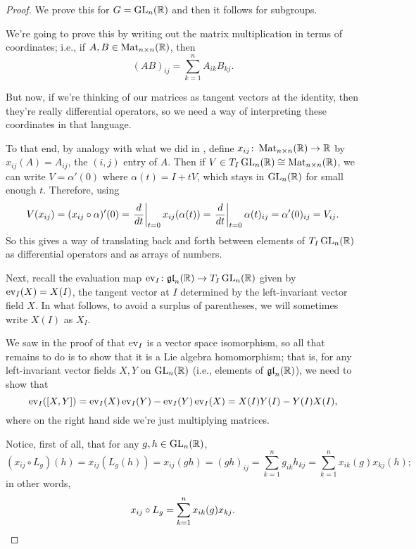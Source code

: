 \begin{proof}
	We prove this for $G = \operatorname{GL}_n(\mathbb{R})$ and then it follows for subgroups.
	
	We're going to prove this by writing out the matrix multiplication in terms of coordinates; i.e., if $A,B \in \operatorname{Mat}_{n \times n}(\mathbb{R})$, then
	\[
		(AB)_{ij} = \sum_{k=1}^n A_{ik}B_{kj}.
	\]
	
	But now, if we're thinking of our matrices as tangent vectors at the identity, then they're really differential operators, so we need a way of interpreting these coordinates in that language.
	
	To that end, by analogy with what we did in , define $x_{ij} \colon\thinspace\! \operatorname{Mat}_{n \times n}(\mathbb{R}) \to \mathbb{R}$ by $x_{ij}(A) = A_{ij}$, the $(i,j)$ entry of $A$. Then if $V \in T_I \operatorname{GL}_n(\mathbb{R}) \cong \operatorname{Mat}_{n \times n}(\mathbb{R})$, we can write $V = \alpha'(0)$ where $\alpha(t) = I + tV$, which stays in $\operatorname{GL}_n(\mathbb{R})$ for small enough $t$. Therefore, using 
	\begin{equation}\label{eq:V(x_{ij})}
		V(x_{ij}) = (x_{ij} \circ \alpha)'(0) = \left. \frac{d}{dt}\right|_{t=0} x_{ij}(\alpha(t)) = \left. \frac{d}{dt}\right|_{t=0} \alpha(t)_{ij} = \alpha'(0)_{ij} = V_{ij}.
	\end{equation}
	So this gives a way of translating back and forth between elements of $T_I\operatorname{GL}_n(\mathbb{R})$ as differential operators and as arrays of numbers.
	
	Next, recall the evaluation map $\operatorname{ev}_I \colon\thinspace\! \mathfrak{gl}_n(\mathbb{R}) \to T_I \operatorname{GL}_n(\mathbb{R})$ given by $\operatorname{ev}_I(X) = X(I)$, the tangent vector at $I$ determined by the left-invariant vector field $X$. In what follows, to avoid a surplus of parentheses, we will sometimes write $X(I)$ as $X_I$.
	
	We saw in the proof of  that $\operatorname{ev}_I$ is a vector space isomorphism, so all that remains to do is to show that it is a Lie algebra homomorphism; that is, for any left-invariant vector fields $X,Y$ on $\operatorname{GL}_n(\mathbb{R})$ (i.e., elements of $\mathfrak{gl}_n(\mathbb{R})$), we need to show that
	\[
		\operatorname{ev}_I([X,Y]) = \operatorname{ev}_I(X)\operatorname{ev}_I(Y) - \operatorname{ev}_I(Y)\operatorname{ev}_I(X) = X(I) Y(I) - Y(I) X(I),
	\]
	where on the right hand side we're just multiplying matrices.
	
	Notice, first of all, that for any $g,h \in \operatorname{GL}_n(\mathbb{R})$,
	\[
		\left(x_{ij} \circ L_g\right)(h) = x_{ij}\left(L_g(h)\right) = x_{ij}(gh) = (gh)_{ij} = \sum_{k=1}^n g_{ik}h_{kj} = \sum_{k=1}^n x_{ik}(g) x_{kj}(h);
	\]
	in other words,
	\begin{equation}\label{eq:x_{ij} circ L_g}
		x_{ij} \circ L_g = \sum_{k=1}^n x_{ik}(g) x_{kj}.
	\end{equation}
	

\end{proof}
